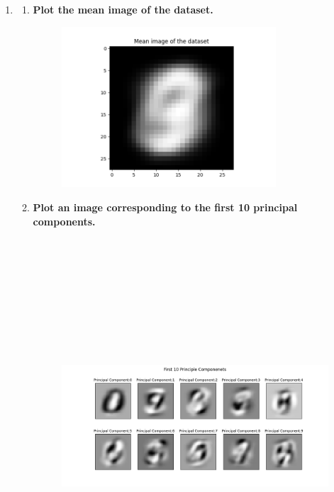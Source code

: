 \documentclass[submit]{harvardml}
\begin{document}
\begin{enumerate}
    \item 
    \begin{enumerate}
        \item \textbf{Plot the mean image of the dataset.}
        \begin{figure}[H]
            \includegraphics[width=8cm]{hw5/plots/2_2a.png}
            \centering
        \end{figure}
        \item \textbf{Plot an image corresponding to the first 10 principal components.}
        \begin{figure}[H]
            \includegraphics[height=14cm]{hw5/plots/2_2b.png}
            \centering
        \end{figure}

\end{enumerate}
\end{enumerate}
\end{document}
